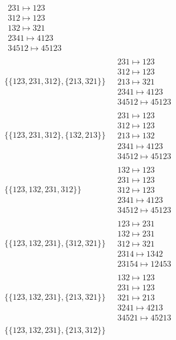 \begin{scriptsize}
\begin{align}
\begin{matrix}
231 \mapsto 123\\312 \mapsto 123\\132 \mapsto 321\\2341 \mapsto 4123\\34512 \mapsto 45123
\end{matrix}
\\
\{\{123, 231, 312\}, \{213, 321\}\}
\ 
&
\begin{matrix}
231 \mapsto 123\\312 \mapsto 123\\213 \mapsto 321\\2341 \mapsto 4123\\34512 \mapsto 45123
\end{matrix}
\\
\{\{123, 231, 312\}, \{132, 213\}\}
\ 
&
\begin{matrix}
231 \mapsto 123\\312 \mapsto 123\\213 \mapsto 132\\2341 \mapsto 4123\\34512 \mapsto 45123
\end{matrix}
\\
\{\{123, 132, 231, 312\}\}
\ 
&
\begin{matrix}
132 \mapsto 123\\231 \mapsto 123\\312 \mapsto 123\\2341 \mapsto 4123\\34512 \mapsto 45123
\end{matrix}
\\
\{\{123, 132, 231\}, \{312, 321\}\}
\ 
&
\begin{matrix}
123 \mapsto 231\\132 \mapsto 231\\312 \mapsto 321\\2314 \mapsto 1342\\23154 \mapsto 12453
\end{matrix}
\\
\{\{123, 132, 231\}, \{213, 321\}\}
\ 
&
\begin{matrix}
132 \mapsto 123\\231 \mapsto 123\\321 \mapsto 213\\3241 \mapsto 4213\\34521 \mapsto 45213
\end{matrix}
\\
\{\{123, 132, 231\}, \{213, 312\}\}
\ 
&
\begin{matrix}

\end{matrix}
\end{align}
\end{scriptsize}
